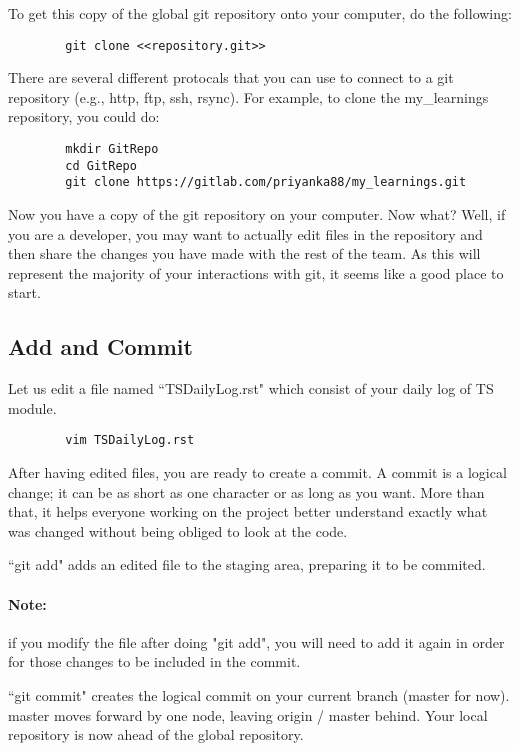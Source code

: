 \documentclass{book}
\begin{document}
    To get this copy of the global git repository onto your computer, do the following:

    \begin{verbatim}
        git clone <<repository.git>>
    \end{verbatim}

    There are several different protocals that you can use to connect to a git repository (e.g., http, ftp, ssh, rsync). For example, to clone the my\_learnings repository, you could do:

    \begin{verbatim}
        mkdir GitRepo
        cd GitRepo
        git clone https://gitlab.com/priyanka88/my_learnings.git
    \end{verbatim}

    Now you have a copy of the git repository on your computer. Now what? Well, if you are a developer, you may want to actually edit files in the repository and then share the changes you have made with the rest of the team. As this will represent the majority of your interactions with git, it seems like a good place to start.

    \subsection*{Add and Commit}
    Let us edit a file named ``TSDailyLog.rst" which consist of your daily log of TS module.
    \begin{verbatim}
        vim TSDailyLog.rst
    \end{verbatim}

    After having edited files, you are ready to create a commit. A commit is a logical change; it can be as short as one character or as long as you want. More than that, it helps everyone working on the project better understand exactly what was changed without being obliged to look at the code.

    ``git add" adds an edited file to the staging area, preparing it to be
    commited.

    \paragraph{Note:} if you modify the file after doing "git add", you will need to add it again in order for those changes to be included in the commit.
    
    ``git commit" creates the logical commit on your current branch (master for now). master moves forward by one node, leaving origin / master behind. Your local repository is now ahead of the global repository.
\end{document}
